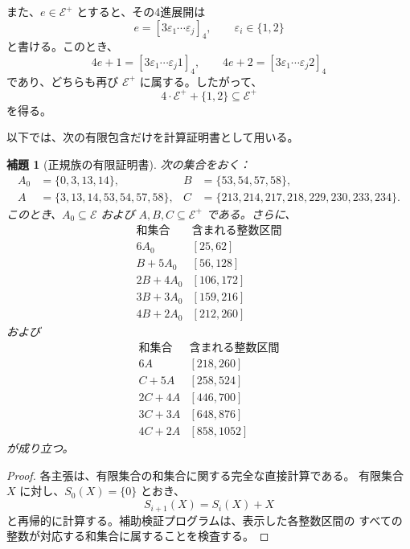 \documentclass[12pt]{ltjsarticle}
\theoremstyle{plain}
\newtheorem{lemma}[theorem]{補題}
\theoremstyle{definition}
\theoremstyle{plain}
\begin{document}
また、$e\in\mathcal E^+$ とすると、その4進展開は
\[
 e=[3\varepsilon_1\cdots\varepsilon_j]_4,
 \qquad \varepsilon_i\in\{1,2\}
\]
と書ける。このとき、
\[
 4e+1=[3\varepsilon_1\cdots\varepsilon_j1]_4,
 \qquad
 4e+2=[3\varepsilon_1\cdots\varepsilon_j2]_4
\]
であり、どちらも再び $\mathcal E^+$ に属する。したがって、
\begin{equation}\label{eq:Eclosure}
 4\cdot\mathcal E^++\{1,2\}\subseteq\mathcal E^+
\end{equation}
を得る。

以下では、次の有限包含だけを計算証明書として用いる。

\begin{lemma}[正規族の有限証明書]
\label{lem:Ecertificate}
次の集合をおく：
\[
\begin{aligned}
 A_0&=\{0,3,13,14\},
 &B&=\{53,54,57,58\},\\
 A&=\{3,13,14,53,54,57,58\},
 &C&=\{213,214,217,218,229,230,233,234\}.
\end{aligned}
\]
このとき、$A_0\subseteq\mathcal E$ および
$A,B,C\subseteq\mathcal E^+$ である。さらに、
\begin{equation}\label{eq:E-small-certificate}
\begin{array}{c|c}
\text{和集合}&\text{含まれる整数区間}\\ \hline
6A_0 &[25,62]\\
B+5A_0 &[56,128]\\
2B+4A_0 &[106,172]\\
3B+3A_0 &[159,216]\\
4B+2A_0 &[212,260]
\end{array}
\end{equation}
および
\begin{equation}\label{eq:E-tail-certificate}
\begin{array}{c|c}
\text{和集合}&\text{含まれる整数区間}\\ \hline
6A &[218,260]\\
C+5A &[258,524]\\
2C+4A &[446,700]\\
3C+3A &[648,876]\\
4C+2A &[858,1052]
\end{array}
\end{equation}
が成り立つ。
\end{lemma}

\begin{proof}
各主張は、有限集合の和集合に関する完全な直接計算である。
有限集合 $X$ に対し、$S_0(X)=\{0\}$ とおき、
\[
 S_{i+1}(X)=S_i(X)+X
\]
と再帰的に計算する。補助検証プログラムは、表示した各整数区間の
すべての整数が対応する和集合に属することを検査する。
\end{proof}
\end{document}
